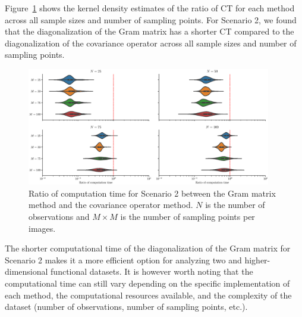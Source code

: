 \begin{results}
\begin{figure}
\end{figure}
Figure~\ref{fig:computation_time_mfd_2d} shows the kernel density estimates of the ratio of CT for each method across all sample sizes and number of sampling points. For Scenario 2, we found that the diagonalization of the Gram matrix has a shorter CT compared to the diagonalization of the covariance operator across all sample sizes and number of sampling points.
\begin{figure}
     \centering
    \includegraphics[width=0.95\textwidth]{figures/scenario_2/computation_time.eps}
    \caption{Ratio of computation time for Scenario 2 between the Gram matrix method and the covariance operator method. $N$ is the number of observations and $M \times M$ is the number of sampling points per images.}
    \label{fig:computation_time_mfd_2d}
\end{figure}
The shorter computational time of the diagonalization of the Gram matrix for  Scenario 2 makes it a more efficient option for analyzing two and higher-dimensional functional datasets. It is however worth noting that the computational time can still vary depending on the specific implementation of each method, the computational resources available, and the complexity of the dataset (number of observations, number of sampling points, etc.).
\end{results}

